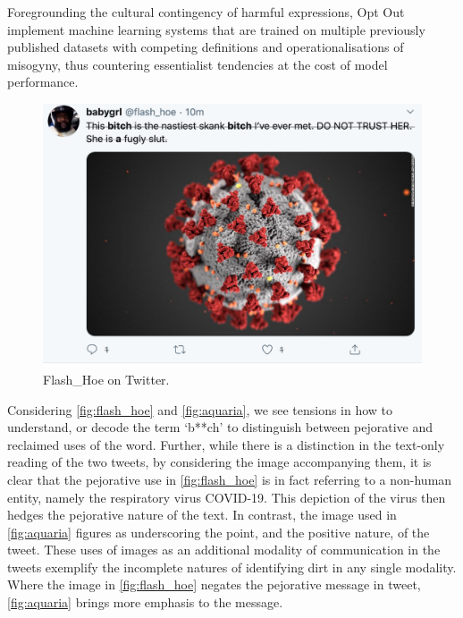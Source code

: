 Foregrounding the cultural contingency of harmful expressions, Opt Out implement machine learning systems that are trained on multiple previously published datasets with competing definitions and operationalisations of misogyny, thus countering essentialist tendencies at the cost of model performance.

\begin{figure}[!ht]
  \centering
  \includegraphics[scale=0.5]{Rona.png}
  \caption{Flash\_Hoe on Twitter.}
  \label{fig:flash_hoe}
\end{figure}

Considering \autoref{fig:flash_hoe} and \autoref{fig:aquaria}, we see tensions in how to understand, or decode the term `b**ch' to distinguish between pejorative and reclaimed uses of the word. Further, while there is a distinction in the text-only reading of the two tweets, by considering the image accompanying them, it is clear that the pejorative use in \autoref{fig:flash_hoe} is in fact referring to a non-human entity, namely the respiratory virus COVID-19. This depiction of the virus then hedges the pejorative nature of the text. In contrast, the image used in \autoref{fig:aquaria} figures as underscoring the point, and the positive nature, of the tweet. These uses of images as an additional modality of communication in the tweets exemplify the incomplete natures of identifying dirt in any single modality. Where the image in \autoref{fig:flash_hoe} negates the pejorative message in tweet, \autoref{fig:aquaria} brings more emphasis to the message.

